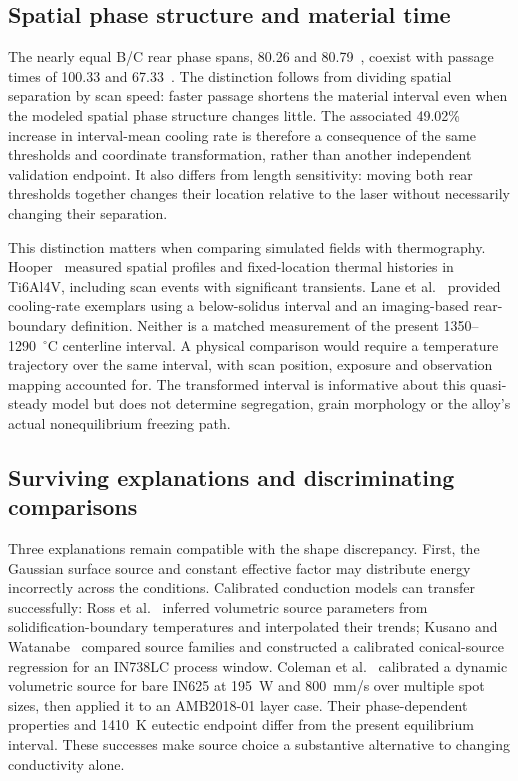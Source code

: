 \subsection{Spatial phase structure and material time}
The nearly equal B/C rear phase spans, 80.26 and 80.79~\um{}, coexist with passage times of 100.33 and 67.33~\us{}. The distinction follows from dividing spatial separation by scan speed: faster passage shortens the material interval even when the modeled spatial phase structure changes little. The associated 49.02\% increase in interval-mean cooling rate is therefore a consequence of the same thresholds and coordinate transformation, rather than another independent validation endpoint. It also differs from length sensitivity: moving both rear thresholds together changes their location relative to the laser without necessarily changing their separation.

This distinction matters when comparing simulated fields with thermography. Hooper~\cite{hooper2018} measured spatial profiles and fixed-location thermal histories in Ti6Al4V, including scan events with significant transients. Lane et al.~\cite{lane2020} provided cooling-rate exemplars using a below-solidus interval and an imaging-based rear-boundary definition. Neither is a matched measurement of the present 1350--1290~$^\circ$C centerline interval. A physical comparison would require a temperature trajectory over the same interval, with scan position, exposure and observation mapping accounted for. The transformed interval is informative about this quasi-steady model but does not determine segregation, grain morphology or the alloy's actual nonequilibrium freezing path.

\subsection{Surviving explanations and discriminating comparisons}
Three explanations remain compatible with the shape discrepancy. First, the Gaussian surface source and constant effective factor may distribute energy incorrectly across the conditions. Calibrated conduction models can transfer successfully: Ross et al.~\cite{ross2022} inferred volumetric source parameters from solidification-boundary temperatures and interpolated their trends; Kusano and Watanabe~\cite{heatsourcebayes2024} compared source families and constructed a calibrated conical-source regression for an IN738LC process window. Coleman et al.~\cite{dynamic2024} calibrated a dynamic volumetric source for bare IN625 at 195~W and 800~mm/s over multiple spot sizes, then applied it to an AMB2018-01 layer case. Their phase-dependent properties and 1410~K eutectic endpoint differ from the present equilibrium interval. These successes make source choice a substantive alternative to changing conductivity alone.

